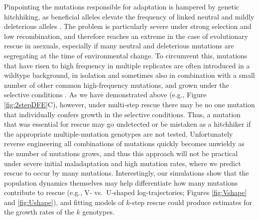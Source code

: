 \documentclass[9pt,twocolumn,twoside,lineno]{gsajnl}
\begin{document}
Pinpointing the mutations responsible for adaptation is hampered by genetic hitchhiking, as beneficial alleles elevate the frequency of linked neutral and mildly deleterious alleles \citep{barton2000genetic}.
The problem is particularly severe under strong selection and low recombination, and therefore reaches an extreme in the case of evolutionary rescue in asexuals, especially if many neutral and deleterious mutations are segregating at the time of environmental change.
To circumvent this, mutations that have risen to high frequency in multiple replicates are often introduced in a wildtype background, in isolation and sometimes also in combination with a small number of other common high-frequency mutations, and grown under the selective conditions \citep[e.g.,][]{jochumsen2016evolution,ono2017widespread}.
As we have demonstrated above (e.g., Figure \ref{fig:2stepDFE}C), however, under multi-step rescue there may be no one mutation that individually confers growth in the selective conditions.
Thus, a mutation that was essential for rescue may go undetected or be mistaken as a hitchhiker if the appropriate multiple-mutation genotypes are not tested. 
Unfortunately reverse engineering all combinations of mutations quickly becomes unwieldy as the number of mutations grows, and thus this approach will not be practical under severe initial maladaptation and high mutation rates, where we predict rescue to occur by many mutations.
Interestingly, our simulations show that the population dynamics themselves may help differentiate how many mutations contribute to rescue (e.g., V- vs.\ U-shaped log-trajectories; Figures \ref{fig:Vshape} and \ref{fig:Ushape}), and fitting models of $k$-step rescue could produce estimates for the growth rates of the $k$ genotypes.
\end{document}
